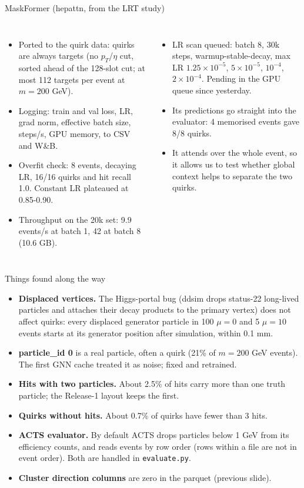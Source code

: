 \documentclass[aspectratio=169,10pt]{beamer}
\begin{document}
\begin{frame}{MaskFormer (hepattn, from the LRT study)}
\footnotesize
\begin{columns}[T]
\begin{itemize}
\item Ported to the quirk data: quirks are always targets (no $p_T$/$\eta$ cut, sorted ahead of the 128-slot cut; at most 112 targets per event at $m = 200$ GeV).
\item Logging: train and val loss, LR, grad norm, effective batch size, steps/s, GPU memory, to CSV and W\&B.
\item Overfit check: 8 events, decaying LR, 16/16 quirks and hit recall 1.0. Constant LR plateaued at 0.85-0.90.
\item Throughput on the 20k set: 9.9 events/s at batch 1, 42 at batch 8 (10.6 GB).
\end{itemize}
\begin{itemize}
\item LR scan queued: batch 8, 30k steps, warmup-stable-decay, max LR $1.25\times10^{-5}$, $5\times10^{-5}$, $10^{-4}$, $2\times10^{-4}$. Pending in the GPU queue since yesterday.
\item Its predictions go straight into the evaluator: 4 memorised events gave 8/8 quirks.
\item It attends over the whole event, so it allows us to test whether global context helps to separate the two quirks.
\end{itemize}
\end{columns}
\end{frame}

\begin{frame}{Things found along the way}
\footnotesize
\begin{itemize}
\item \textbf{Displaced vertices.} The Higgs-portal bug (ddsim drops status-22 long-lived particles and attaches their decay products to the primary vertex) does not affect quirks: every displaced generator particle in 100 $\mu = 0$ and 5 $\mu = 10$ events starts at its generator position after simulation, within 0.1 mm.
\item \textbf{particle\_id 0} is a real particle, often a quirk (21\% of $m = 200$ GeV events). The first GNN cache treated it as noise; fixed and retrained.
\item \textbf{Hits with two particles.} About 2.5\% of hits carry more than one truth particle; the Release-1 layout keeps the first.
\item \textbf{Quirks without hits.} About 0.7\% of quirks have fewer than 3 hits.
\item \textbf{ACTS evaluator.} By default ACTS drops particles below 1 GeV from its efficiency counts, and reads events by row order (rows within a file are not in event order). Both are handled in \texttt{evaluate.py}.
\item \textbf{Cluster direction columns} are zero in the parquet (previous slide).
\end{itemize}
\end{frame}
\end{document}
